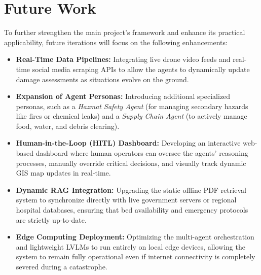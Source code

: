 \documentclass[conference,twocolumn,twoside]{IEEEtran}
\begin{document}
\section{Future Work}
To further strengthen the main project's framework and enhance its practical applicability, future iterations will focus on the following enhancements:
\begin{itemize}
    \item \textbf{Real-Time Data Pipelines:} Integrating live drone video feeds and real-time social media scraping APIs to allow the agents to dynamically update damage assessments as situations evolve on the ground.
    \item \textbf{Expansion of Agent Personas:} Introducing additional specialized personas, such as a \textit{Hazmat Safety Agent} (for managing secondary hazards like fires or chemical leaks) and a \textit{Supply Chain Agent} (to actively manage food, water, and debris clearing).
    \item \textbf{Human-in-the-Loop (HITL) Dashboard:} Developing an interactive web-based dashboard where human operators can oversee the agents' reasoning processes, manually override critical decisions, and visually track dynamic GIS map updates in real-time.
    \item \textbf{Dynamic RAG Integration:} Upgrading the static offline PDF retrieval system to synchronize directly with live government servers or regional hospital databases, ensuring that bed availability and emergency protocols are strictly up-to-date.
    \item \textbf{Edge Computing Deployment:} Optimizing the multi-agent orchestration and lightweight LVLMs to run entirely on local edge devices, allowing the system to remain fully operational even if internet connectivity is completely severed during a catastrophe.
\end{itemize}
\end{document}
